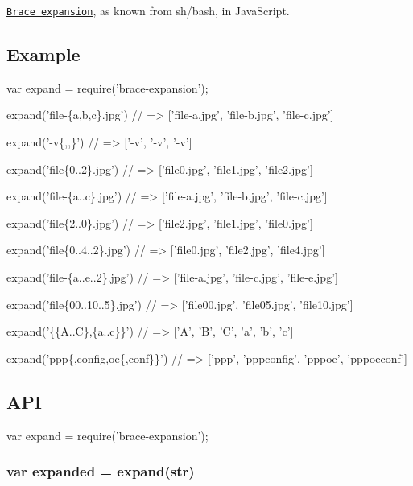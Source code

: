 \href{https://www.gnu.org/software/bash/manual/html_node/Brace-Expansion.html}{\tt Brace expansion}, as known from sh/bash, in Java\+Script.

\href{http://travis-ci.org/juliangruber/brace-expansion}{\tt } \href{https://www.npmjs.org/package/brace-expansion}{\tt } \href{https://greenkeeper.io/}{\tt }

\href{https://ci.testling.com/juliangruber/brace-expansion}{\tt }

\subsection*{Example}


\begin{DoxyCode}
var expand = require('brace-expansion');

expand('file-\{a,b,c\}.jpg')
// => ['file-a.jpg', 'file-b.jpg', 'file-c.jpg']

expand('-v\{,,\}')
// => ['-v', '-v', '-v']

expand('file\{0..2\}.jpg')
// => ['file0.jpg', 'file1.jpg', 'file2.jpg']

expand('file-\{a..c\}.jpg')
// => ['file-a.jpg', 'file-b.jpg', 'file-c.jpg']

expand('file\{2..0\}.jpg')
// => ['file2.jpg', 'file1.jpg', 'file0.jpg']

expand('file\{0..4..2\}.jpg')
// => ['file0.jpg', 'file2.jpg', 'file4.jpg']

expand('file-\{a..e..2\}.jpg')
// => ['file-a.jpg', 'file-c.jpg', 'file-e.jpg']

expand('file\{00..10..5\}.jpg')
// => ['file00.jpg', 'file05.jpg', 'file10.jpg']

expand('\{\{A..C\},\{a..c\}\}')
// => ['A', 'B', 'C', 'a', 'b', 'c']

expand('ppp\{,config,oe\{,conf\}\}')
// => ['ppp', 'pppconfig', 'pppoe', 'pppoeconf']
\end{DoxyCode}


\subsection*{A\+PI}


\begin{DoxyCode}
var expand = require('brace-expansion');
\end{DoxyCode}


\subsubsection*{var expanded = expand(str)}

